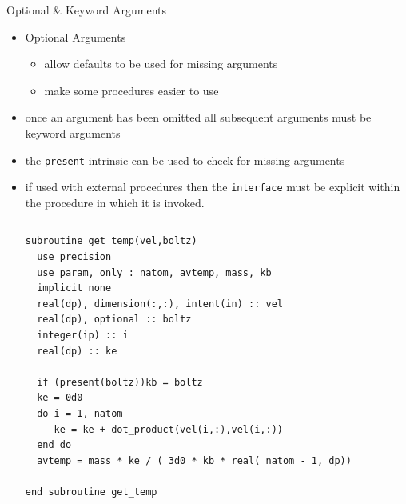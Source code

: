 \documentclass[c,mathserif,compress,xcolor=svgnames]{beamer}
\newcommand{\lstfortran}[1]{\lstinline[language={[90]Fortran},basicstyle=\footnotesize\ttfamily]|#1|}
\begin{document}
\begin{frame}{Optional \& Keyword Arguments}
  \begin{itemize}
    \item Optional Arguments
      \begin{itemize}
        \item allow defaults to be used for missing arguments
        \item make some procedures easier to use
      \end{itemize}
    \item once an argument has been omitted all subsequent arguments must be keyword arguments
    \item the \lstfortran{present} intrinsic can be used to check for missing arguments
    \item if used with external procedures then the \lstfortran{interface} must be explicit within the procedure in which it is invoked.
      \begin{columns}[t]
        \begin{lstlisting}[language={[90]Fortran},basicstyle=\fontsize{4}{5}\selectfont\ttfamily,mathescape]
subroutine get_temp(vel,boltz)
  use precision
  use param, only : natom, avtemp, mass, kb
  implicit none
  real(dp), dimension(:,:), intent(in) :: vel
  real(dp), optional :: boltz
  integer(ip) :: i
  real(dp) :: ke

  if (present(boltz))kb = boltz
  ke = 0d0
  do i = 1, natom
     ke = ke + dot_product(vel(i,:),vel(i,:))
  end do
  avtemp = mass * ke / ( 3d0 * kb * real( natom - 1, dp))
  
end subroutine get_temp



\end{lstlisting}
\end{columns}
\end{itemize}
\end{frame}
\end{document}
